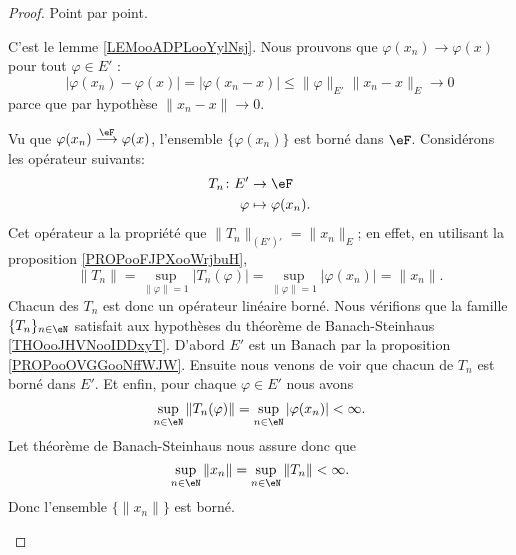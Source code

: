 \begin{proof}
    Point par point.
    \begin{subproof}
        C'est le lemme \ref{LEMooADPLooYylNsj}.
            Nous prouvons que \( \varphi(x_n)\to\varphi(x)\) pour tout \( \varphi\in E'\) :
            \begin{equation}
                | \varphi(x_n)-\varphi(x) |=| \varphi(x_n-x) |\leq \| \varphi \|_{E'}\| x_n-x \|_E\to 0
            \end{equation}
            parce que par hypothèse \( \| x_n-x \|\to 0\).
         
        Vu que \( \varphi(x_n)\stackrel{\eF}{\longrightarrow}\varphi(x)\), l'ensemble \( \{ \varphi(x_n) \}\) est borné dans \( \eF\). Considérons les opérateur suivants:
        \begin{equation}
            \begin{aligned}
                T_n\colon E'&\to \eF \\
                \varphi&\mapsto \varphi(x_n). 
            \end{aligned}
        \end{equation}
        Cet opérateur a la propriété que \( \| T_n \|_{(E')'}=\| x_n \|_E\); en effet, en utilisant la proposition \ref{PROPooFJPXooWrjbuH},
        \begin{equation}
            \| T_n \|=\sup_{\| \varphi \|=1}| T_n(\varphi) |=\sup_{\| \varphi \|=1}| \varphi(x_n) |=\| x_n \|.
        \end{equation}
        Chacun des \( T_n\) est donc un opérateur linéaire borné. Nous vérifions que la famille \( \{ T_n \}_{n\in \eN}\) satisfait aux hypothèses du théorème de Banach-Steinhaus \ref{THOooJHVNooIDDxyT}. D'abord \( E'\) est un Banach par la proposition \ref{PROPooOVGGooNffWJW}. Ensuite nous venons de voir que chacun de  \(  T_n \) est borné dans \( E'\). Et enfin, pour chaque \( \varphi\in E'\) nous avons
        \begin{equation}
            \sup_{n\in \eN}\| T_n(\varphi) \|=\sup_{n\in \eN}| \varphi(x_n) |<\infty.
        \end{equation}
        Let théorème de Banach-Steinhaus nous assure donc que
        \begin{equation}
            \sup_{n\in \eN}\| x_n \|=\sup_{n\in \eN}\| T_n \|<\infty.
        \end{equation}
        Donc l'ensemble \( \{ \| x_n \| \}\) est borné.


\end{subproof}
\end{proof}
